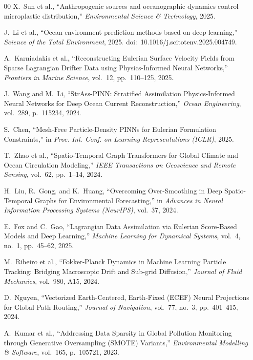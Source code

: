 \documentclass[conference]{IEEEtran}
\begin{document}
\begin{thebibliography}{00}
X.~Sun et al., ``Anthropogenic sources and oceanographic dynamics control microplastic distribution,'' \textit{Environmental Science \& Technology}, 2025.

J.~Li et al., ``Ocean environment prediction methods based on deep learning,'' \textit{Science of the Total Environment}, 2025. doi:~10.1016/j.scitotenv.2025.004749.


A.~Karniadakis et al., ``Reconstructing Eulerian Surface Velocity Fields from Sparse Lagrangian Drifter Data using Physics-Informed Neural Networks,'' \textit{Frontiers in Marine Science}, vol.~12, pp.~110--125, 2025.

J.~Wang and M.~Li, ``StrAss-PINN: Stratified Assimilation Physics-Informed Neural Networks for Deep Ocean Current Reconstruction,'' \textit{Ocean Engineering}, vol.~289, p.~115234, 2024.

S.~Chen, ``Mesh-Free Particle-Density PINNs for Eulerian Formulation Constraints,'' in \textit{Proc. Int. Conf. on Learning Representations (ICLR)}, 2025.

T.~Zhao et al., ``Spatio-Temporal Graph Transformers for Global Climate and Ocean Circulation Modeling,'' \textit{IEEE Transactions on Geoscience and Remote Sensing}, vol.~62, pp.~1--14, 2024.

H.~Liu, R.~Gong, and K.~Huang, ``Overcoming Over-Smoothing in Deep Spatio-Temporal Graphs for Environmental Forecasting,'' in \textit{Advances in Neural Information Processing Systems (NeurIPS)}, vol.~37, 2024.

E.~Fox and C.~Gao, ``Lagrangian Data Assimilation via Eulerian Score-Based Models and Deep Learning,'' \textit{Machine Learning for Dynamical Systems}, vol.~4, no.~1, pp.~45--62, 2025.

M.~Ribeiro et al., ``Fokker-Planck Dynamics in Machine Learning Particle Tracking: Bridging Macroscopic Drift and Sub-grid Diffusion,'' \textit{Journal of Fluid Mechanics}, vol.~980, A15, 2024.

D.~Nguyen, ``Vectorized Earth-Centered, Earth-Fixed (ECEF) Neural Projections for Global Path Routing,'' \textit{Journal of Navigation}, vol.~77, no.~3, pp.~401--415, 2024.

A.~Kumar et al., ``Addressing Data Sparsity in Global Pollution Monitoring through Generative Oversampling (SMOTE) Variants,'' \textit{Environmental Modelling \& Software}, vol.~165, p.~105721, 2023.


\end{thebibliography}
\end{document}
